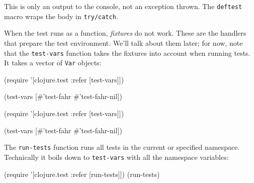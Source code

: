 \else

\begin{english}
\end{english}

\fi

This is only an output to the console, not an exception thrown. The \verb|deftest| macro wraps the body in \verb|try/catch|.

When the test runs as a function, \emph{fixtures} do not work. These are the handlers that prepare the test environment. We'll talk about them later; for now, note that the \verb|test-vars| function takes the fixtures into account when running tests. It takes a vector of \verb|Var| objects:

\ifx\DEVICETYPE\MOBILE

\begin{english}
  \begin{clojure}
(require
  '[clojure.test :refer [test-vars]])

(test-vars
  [#'test-fahr #'test-fahr-nil])
  \end{clojure}
\end{english}

\else

\begin{english}
  \begin{clojure}
(require '[clojure.test :refer [test-vars]])

(test-vars [#'test-fahr #'test-fahr-nil])
  \end{clojure}
\end{english}

\fi


The \verb|run-tests| function runs all tests in the current or specified namespace. Technically it boils down to \verb|test-vars| with all the namespace variables:

\ifx\DEVICETYPE\MOBILE

\begin{english}
  \begin{clojure}
(require
  '[clojure.test :refer [run-tests]])
(run-tests)
  \end{clojure}
\end{english}

